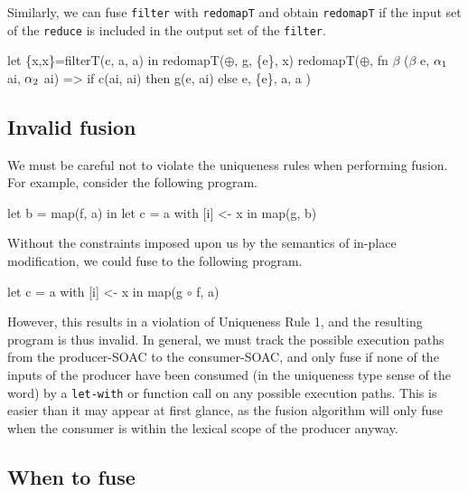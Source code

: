 Similarly, we can fuse \texttt{filter} with \texttt{redomapT} and
obtain \texttt{redomapT} if the input set of the \texttt{reduce} is
included in the output set of the \texttt{filter}.

\begin{colorcode}
let \{x,x\}=filterT(c, a, a)
in  redomapT(\(\oplus\), g, \{e\}, x)
    \emphh{\(\Downarrow\)}
redomapT(\(\oplus\),
         fn \(\beta\) (\(\beta\) e, \(\alpha_{1}\) ai, \(\alpha_{2}\) ai) =>
           if c(ai, ai)
           then g(e, ai)
           else e,
         \{e\}, a, a )
\end{colorcode}

\subsection{Invalid fusion}
\label{sec:invalidfusion}

We must be careful not to violate the uniqueness rules when performing
fusion.  For example, consider the following program.

\begin{colorcode}
let b = map(f, a) in
let c = a with [i] <- x in
map(g, b)
\end{colorcode}

Without the constraints imposed upon us by the semantics of in-place
modification, we could fuse to the following program.

\begin{colorcode}
let c = a with [i] <- x in
map(g \(\circ\) f, a)
\end{colorcode}

However, this results in a violation of Uniqueness Rule 1, and the
resulting program is thus invalid.  In general, we must track the
possible execution paths from the producer-SOAC to the consumer-SOAC,
and only fuse if none of the inputs of the producer have been consumed
(in the uniqueness type sense of the word) by a \texttt{let-with} or
function call on any possible execution paths.  This is easier than it
may appear at first glance, as the fusion algorithm will only fuse
when the consumer is within the lexical scope of the producer anyway.

\subsection{When to fuse}
\label{sec:whentofuse}

